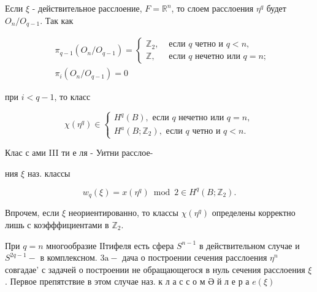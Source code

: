 \documentclass[10pt]{article}
\begin{document}
Если $\xi$ - действительное расслоение, $F=\mathbb{R}^{n}$, то слоем расслоения $\eta^{q}$ будет $O_{n} / O_{q-1}$. Так как



\[

\begin{aligned}

& \pi_{q-1}\left(O_{n} / O_{q-1}\right)= \begin{cases}\mathbb{Z}_{2}, & \text { если } q \text { четно и } q<n, \\

\mathbb{Z}, & \text { если } q \text { нечетно или } q=n ;\end{cases} \\

& \pi_{i}\left(O_{n} / O_{q-1}\right)=0

\end{aligned}

\]



при $i<q-1$, то класс



\[

\chi\left(\eta^{q}\right) \in\left\{\begin{array}{l}

H^{q}(B), \text { если } q \text { нечетно или } q=n, \\

H^{a}\left(B ; \mathbb{Z}_{2}\right), \text { если } q \text { четно и } q<n .

\end{array}\right.

\]



Клас с ами III ти е ля - Уитни расслое-



ния $\xi$ наз. классы



\[

w_{q}(\xi)=x\left(\eta^{q}\right) \bmod 2 \in H^{q}\left(B ; \mathbb{Z}_{2}\right) .

\]



Впрочем, если $\xi$ неориентированно, то классы $\chi\left(\eta^{q}\right)$ определены корректно лишь с коэфффициентами в $\mathbb{Z}_{2}$.



При $q=n$ многообразие ІІтифеля есть сфера $S^{n-1}$ в действительном случае и $S^{2 q-1}-$ в комплексном. $3 \mathrm{a}-$ дача о построении сечения расслоения $\eta^{n}$ совгадае' с задачей о построении не обращающегося в нуль сечения расслоения $\xi$. Первое препятствие в этом случае наз. к л а с с о м Ә й л е р а $e(\xi)$
\end{document}
